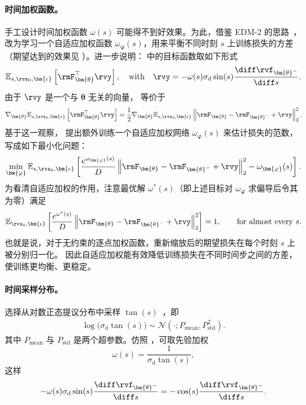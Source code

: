 \paragraph{时间加权函数。}
手工设计时间加权函数 $\omega(s)$ 可能得不到好效果。为此，借鉴 EDM-2 的思路~\citep{karras2024analyzing}，
\citet{lu2024simplifying} 改为学习一个自适应加权函数 $\omega_{\bm{\varphi}}(s)$，用来平衡不同时刻 $s$ 上训练损失的方差
（期望达到的效果见 ）。进一步说明： 中的目标函数取如下形式
\[
\mathbb{E}_{s, \rvx_0, \bm{\epsilon}} \left[\rmF_{\bm{\theta}}^\top \rvy \right],\quad\text{with}\quad \rvy=-\omega(s) \sigma_{\mathrm{d}} \sin(s)\frac{\diff \rvf_{\bm{\theta}^-}}{\diff s}.
\]
由于 $\rvy$ 是一个与 $\bm{\theta}$ 无关的向量， 等价于
\begin{align*}
    \nabla_{\bm{\theta}} \mathbb{E}_{s, \rvx_0, \bm{\epsilon}} \left[\rmF_{\bm{\theta}}^\top \rvy \right]
    = \frac{1}{2} \nabla_{\bm{\theta}} \mathbb{E}_{s, \rvx_0, \bm{\epsilon}} \left\| \rmF_{\bm{\theta}} - \rmF_{\bm{\theta}^-} + \rvy \right\|_2^2.
\end{align*}
基于这一观察，\citet{lu2024simplifying} 提出额外训练一个自适应加权网络 $\omega_{\bm{\varphi}}(s)$ 来估计损失的范数，写成如下最小化问题：
\begin{align*}
    \min_{\bm{\varphi}} \mathbb{E}_{s, \rvx_0, \bm{\epsilon}} \left[ \frac{e^{\omega_{\bm{\varphi}}(s)}}{D} \left\| \rmF_{\bm{\theta}} - \rmF_{\bm{\theta}^-} + \rvy \right\|_2^2 - \omega_{\bm{\varphi}}(s) \right].
\end{align*}
为看清自适应加权的作用，注意最优解 $\omega^*(s)$（即上述目标对 $\omega_{\bm{\varphi}}$ 求偏导后令其为零）满足
\begin{align}\label{eq:effect-adaptive-wgt}
    \mathbb{E}_{\rvx_0,\bm{\epsilon}}
    \left[
    \frac{e^{\omega^*(s)}}{D}
    \left\|
    \rmF_{\bm{\theta}}
    - \rmF_{\bm{\theta}^-}
    + \rvy
    \right\|_2^2
    \right]
    = 1,
    \qquad \text{for almost every } s.
\end{align}
也就是说，对于无约束的逐点加权函数，重新缩放后的期望损失在每个时刻 $s$ 上被分别归一化。
因此自适应加权能有效降低训练损失在不同时间步之间的方差，使训练更均衡、更稳定。

\paragraph{时间采样分布。}\citet{lu2024simplifying} 选择从对数正态提议分布中采样 $\tan(s)$~\citep{karras2022elucidating}，即
\begin{align}\label{eq:s-dist}
    \log\big(\sigma_{\mathrm{d}} \tan(s)\big) \sim \mathcal{N}(\cdot;P_{\text{mean}}, P_{\text{std}}^2).
\end{align}
其中 $P_{\text{mean}}$ 与 $P_{\text{std}}$ 是两个超参数。仿照 \citet{lu2024simplifying}，可取先验加权
\[
\omega(s)=\frac{1}{\sigma_{\mathrm{d}}\tan(s)},
\]
这样
\[
-\omega(s)\sigma_{\mathrm{d}}\sin(s)
\frac{\diff\rvf_{\bm{\theta}^-}}{\diff s}
=
-\cos(s)\frac{\diff\rvf_{\bm{\theta}^-}}{\diff s}.
\]


